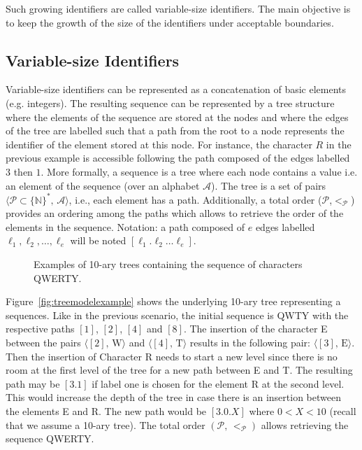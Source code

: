 Such growing identifiers are called variable-size identifiers. The main
objective is to keep the growth of the size of the identifiers under acceptable
boundaries.

\subsection{Variable-size Identifiers}
\label{subsec:variable}

Variable-size identifiers can be represented as a concatenation of basic
elements (e.g. integers). The resulting sequence can be represented by a tree
structure where the elements of the sequence are stored at the nodes and where
the edges of the tree are labelled such that a path from the root to a node
represents the identifier of the element stored at this node. For instance, the
character $R$ in the previous example is accessible following the path composed
of the edges labelled $3$ then $1$. More formally, a sequence is a tree where
each node contains a value i.e. an element of the sequence (over an alphabet
$\mathcal{A}$). The tree is a set of pairs
$\langle\mathcal{P}\subset\{\mathbb{N}\}^*,\, \mathcal{A} \rangle$, i.e., each
element has a path. Additionally, a total order
($\mathcal{P}$,$<_{\mathcal{P}}$) provides an ordering among the paths which
allows to retrieve the order of the elements in the sequence. Notation: a path
composed of $e$ edges labelled $\ell_1,\ell_2,\ldots,\ell_e$ will be noted
$[\ell_1.\ell_2\ldots\ell_e]$.

\begin{figure*}
  \centering
  \hspace{20pt}
  \caption{Examples of 10-ary trees containing the sequence of characters
    QWERTY.}
\end{figure*}


Figure~\ref{fig:treemodelexample} shows the underlying 10-ary tree representing
a sequences. Like in the previous scenario, the initial sequence is QWTY with
the respective paths $[1]$, $[2]$, $[4]$ and $[8]$. The insertion of the
character E between the pairs $\langle [2],\, \text{W}\rangle$ and
$\langle [4],\, \text{T}\rangle$ results in the following pair:
$\langle [3],\, \text{E} \rangle$. Then the insertion of Character R needs to
start a new level since there is no room at the first level of the tree for a
new path between E and T. The resulting path may be $[3.1]$ if label one is
chosen for the element R at the second level. This would increase the depth of
the tree in case there is an insertion between the elements E and R. The new
path would be $[3.0.X]$ where $0<X<10$ (recall that we assume a 10-ary
tree). The total order $(\mathcal{P},\,<_\mathcal{P})$ allows retrieving the
sequence QWERTY.


